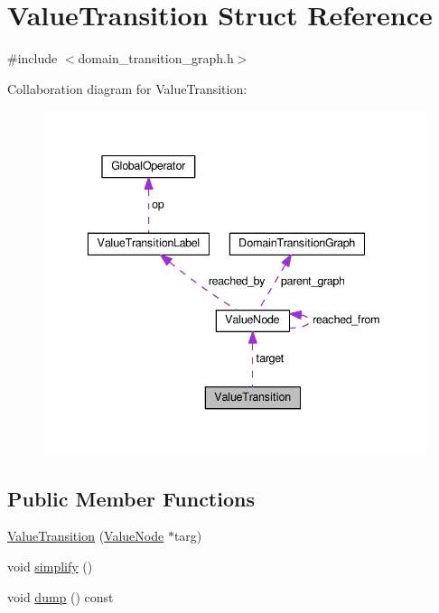 \hypertarget{structValueTransition}{\section{Value\-Transition Struct Reference}
\label{structValueTransition}
}


{\ttfamily \#include $<$domain\-\_\-transition\-\_\-graph.\-h$>$}



Collaboration diagram for Value\-Transition\-:
\nopagebreak
\begin{figure}[H]
\begin{center}
\leavevmode
\includegraphics[width=338pt]{structValueTransition__coll__graph}
\end{center}
\end{figure}
\subsection*{Public Member Functions}
\begin{DoxyCompactItemize}
\item 
\hyperlink{structValueTransition_a5d058daa3111a5519039ac1050acb95a}{Value\-Transition} (\hyperlink{structValueNode}{Value\-Node} $\ast$targ)
\item 
void \hyperlink{structValueTransition_af7b4cb11553914228c1ffff816c1765a}{simplify} ()
\item 
void \hyperlink{structValueTransition_ad609765c6754635ac71fd8554fbbe7ab}{dump} () const 
\end{DoxyCompactItemize}
